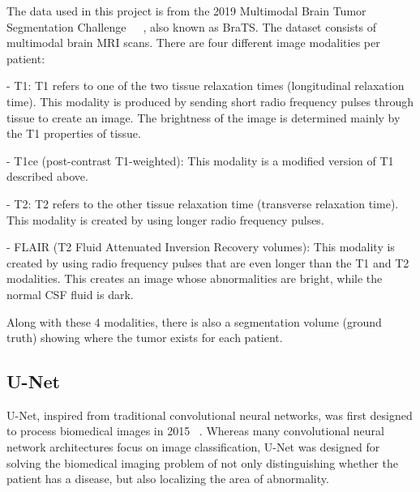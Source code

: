 \documentclass[conference]{IEEEtran}
\begin{document}
The data used in this project is from the 2019 Multimodal Brain Tumor Segmentation Challenge~\cite{menze2014multimodal}~\cite{bakas2017advancing}~\cite{bakas2018identifying}, also known as BraTS. The dataset consists of multimodal brain MRI scans. There are four different image modalities per patient: 
\par - T1: T1 refers to one of the two tissue relaxation times (longitudinal relaxation time). This modality is produced by sending short radio frequency pulses through tissue to create an image. The brightness of the image is determined mainly by the T1 properties of tissue.
\par - T1ce (post-contrast T1-weighted): This modality is a modified version of T1 described above.
\par - T2: T2 refers to the other tissue relaxation time (transverse relaxation time). This modality is created by using longer radio frequency pulses.
\par - FLAIR (T2 Fluid Attenuated Inversion Recovery volumes): This modality is created by using radio frequency pulses that are even longer than the T1 and T2 modalities. This creates an image whose abnormalities are bright, while the normal CSF fluid is dark. 
\par Along with these 4 modalities, there is also a segmentation volume (ground truth) showing where the tumor exists for each patient.

\subsection{U-Net}
U-Net, inspired from traditional convolutional neural networks, was first designed to process biomedical images in 2015 ~\cite{ronneberger2015u}. Whereas many convolutional neural network architectures focus on image classification, U-Net was designed for solving the biomedical imaging problem of not only distinguishing whether the patient has a disease, but also localizing the area of abnormality. 
\end{document}
